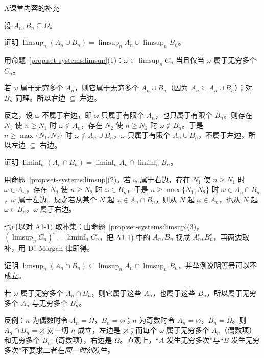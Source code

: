 \begin{exercises}{A}{课堂内容的补充}
\item\label{ex:set-systems:A1} 设 $A_n,B_n\subseteq\Omega$。
\begin{questions}
\item 证明 $\limsup_n(A_n\cup B_n)=\limsup_nA_n\cup\limsup_nB_n$。
\begin{solution}
用命题~\ref{prop:set-systems:limsup}(1)：$\omega\in\limsup_nC_n$ 当且仅当 $\omega$ 属于无穷多个 $C_n$。

若 $\omega$ 属于无穷多个 $A_n$，则它属于无穷多个 $A_n\cup B_n$（因为 $A_n\subseteq A_n\cup B_n$）；对 $B_n$ 同理。所以右边 $\subseteq$ 左边。

反之，设 $\omega$ 不属于右边，即 $\omega$ 只属于有限个 $A_n$，也只属于有限个 $B_n$。则存在 $N_1$ 使 $n\geqslant N_1$ 时 $\omega\notin A_n$，存在 $N_2$ 使 $n\geqslant N_2$ 时 $\omega\notin B_n$。于是 $n\geqslant\max\{N_1,N_2\}$ 时 $\omega\notin A_n\cup B_n$，$\omega$ 只属于有限个 $A_n\cup B_n$，不属于左边。所以左边 $\subseteq$ 右边。
\end{solution}
\item 证明 $\liminf_n(A_n\cap B_n)=\liminf_nA_n\cap\liminf_nB_n$。
\begin{solution}
用命题~\ref{prop:set-systems:limsup}(2)。若 $\omega$ 属于右边，存在 $N_1$ 使 $n\geqslant N_1$ 时 $\omega\in A_n$，存在 $N_2$ 使 $n\geqslant N_2$ 时 $\omega\in B_n$，于是 $n\geqslant\max\{N_1,N_2\}$ 时 $\omega\in A_n\cap B_n$，$\omega$ 属于左边。反之若从某个 $N$ 起 $\omega\in A_n\cap B_n$，则从 $N$ 起 $\omega\in A_n$，也从 $N$ 起 $\omega\in B_n$，$\omega$ 属于右边。

也可以对 A1-1) 取补集：由命题~\ref{prop:set-systems:limsup}(3)，$(\limsup_nC_n)^c=\liminf_nC_n^c$，把 A1-1) 中的 $A_n,B_n$ 换成 $A_n^c,B_n^c$，再两边取补，用 De Morgan 律即得。
\end{solution}
\item 证明 $\limsup_n(A_n\cap B_n)\subseteq\limsup_nA_n\cap\limsup_nB_n$，并举例说明等号可以不成立。
\begin{solution}
若 $\omega$ 属于无穷多个 $A_n\cap B_n$，则它属于这些 $A_n$，也属于这些 $B_n$，所以属于无穷多个 $A_n$ 与无穷多个 $B_n$。

反例：$n$ 为偶数时令 $A_n=\Omega$，$B_n=\varnothing$；$n$ 为奇数时令 $A_n=\varnothing$，$B_n=\Omega$。则 $A_n\cap B_n=\varnothing$ 对一切 $n$ 成立，左边是 $\varnothing$；而每个 $\omega$ 属于无穷多个 $A_n$（偶数项）和无穷多个 $B_n$（奇数项），右边是 $\Omega$。直观上，“$A$ 发生无穷多次”与“$B$ 发生无穷多次”不要求二者在\emph{同一时刻}发生。
\end{solution}
\end{questions}


\end{exercises}
